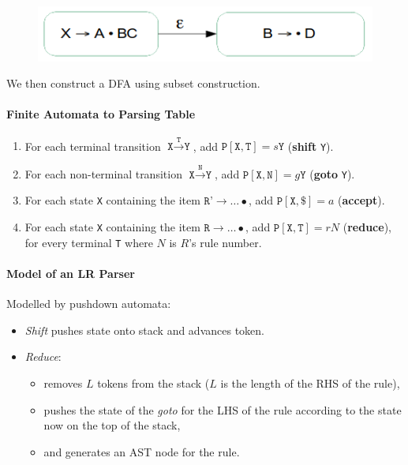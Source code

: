 \documentclass[twocolumn,english]{article}
\begin{document}
\begin{figure}[H]
\centering{}\includegraphics[width=0.4\linewidth]{img/lr0tonfa-nonterminal}
\end{figure}

We then construct a DFA using subset construction.

\paragraph{Finite Automata to Parsing Table}
\begin{enumerate}
\item For each terminal transition $\texttt{X}\xrightarrow{\texttt{T}}\texttt{Y}$,
add $\texttt{P}[\texttt{X},\texttt{T}]=s\texttt{Y}$ (\textbf{shift}
\texttt{Y}).
\item For each non-terminal transition $\texttt{X}\xrightarrow{\texttt{N}}\texttt{Y}$,
add $\texttt{P}[\texttt{X},\texttt{N}]=g\texttt{Y}$ (\textbf{goto}
\texttt{Y}).
\item For each state \texttt{X} containing the item $\texttt{R'}\rightarrow\dots\bullet$,
add $\texttt{P}[\texttt{X},\texttt{\$}]=a$ (\textbf{accept}).
\item For each state \texttt{X} containing the item $\texttt{R}\rightarrow\dots\bullet$,
add $\texttt{P}[\texttt{X},\texttt{T}]=rN$ (\textbf{reduce}), for
every terminal \texttt{T} where $N$ is $R$'s rule number.
\end{enumerate}

\paragraph{Model of an LR Parser}

Modelled by pushdown automata:
\begin{itemize}
\item \emph{Shift} pushes state onto stack and advances token.
\item \emph{Reduce}:
\begin{itemize}
\item removes $L$ tokens from the stack ($L$ is the length of the RHS
of the rule), 
\item pushes the state of the \emph{goto} for the LHS of the rule according
to the state now on the top of the stack,
\item and generates an AST node for the rule.
\end{itemize}
\end{itemize}
\end{document}
